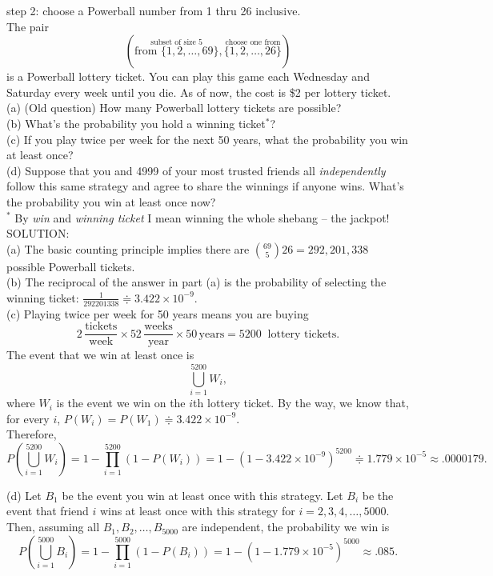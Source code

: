 \documentclass[12pt]{article}
\begin{document}
step 2: choose a Powerball number from 1 thru 26 inclusive. \\
The pair
$$\left( \stackrel{\mbox{subset of size 5}}{\mbox{from }\{1,2,\dots,69\}}, \stackrel{\mbox{choose one from}}{\{1,2,\dots,26\}}\right)$$
is a Powerball lottery ticket.  You can play this game each Wednesday and Saturday every week until you die.  As of now, the cost is \$2 per lottery ticket.\\
(a) (Old question) How many Powerball lottery tickets are possible?\\
(b) What's the probability you hold a winning ticket$^*$?\\
(c) If you play twice per week for the next 50 years, what the probability you win at least once?\\
(d) Suppose that you and 4999 of your most trusted friends all {\em independently} follow this same strategy and agree to share the winnings if anyone wins. What's
the probability you win at least once now?\\
$^*$ By {\em win} and {\em winning ticket} I mean winning the whole shebang -- the jackpot!\\

\noindent SOLUTION:\\
(a) The basic counting principle implies there are ${69\choose 5}26 = 292,201,338$ possible Powerball tickets.\\

\noindent (b) The reciprocal of the answer in part (a) is the probability of selecting the winning ticket: $\frac 1{292201338} \doteqdot 3.422\times 10^{-9}$.\\

\noindent (c) Playing twice per week for 50 years means you are buying
$$2\,\frac {\mbox{tickets}}{\mbox{week}}\times 52\,\frac{\mbox{weeks}}{\mbox{year}}\times 50\,\mbox{years} = 5200\ \mbox{ lottery tickets}.$$
\noindent The event that we win at least once is
$$\bigcup_{i=1}^{5200} W_i,$$
where $W_i$ is the event we win on the $i$th lottery ticket. By the way, we know that, for every $i$, $P(W_i)=P(W_1) \doteqdot 3.422\times 10^{-9}$. \\
\noindent Therefore,
$$P\left(\bigcup_{i=1}^{5200} W_i \right) = 1 - \prod_{i=1}^{5200}\left(1-P(W_i)\right) = 1-\left(1-3.422\times 10^{-9}\right)^{5200}\doteqdot 1.779\times 10^{-5}\approx .0000179.$$

\bigskip

\noindent (d) Let $B_1$ be the event you win at least once with this strategy. Let $B_i$ be the event that friend $i$ wins at least once with this strategy for $i=2,3,4,\dots, 5000$.  Then, assuming all $B_1,B_2,\dots,B_{5000}$ are independent, the probability we win is
$$P\left(\bigcup_{i=1}^{5000} B_i \right) = 1 - \prod_{i=1}^{5000}\left(1-P(B_i)\right) = 1-\left(1-1.779\times 10^{-5}\right)^{5000}\approx .085.$$
\end{document}
